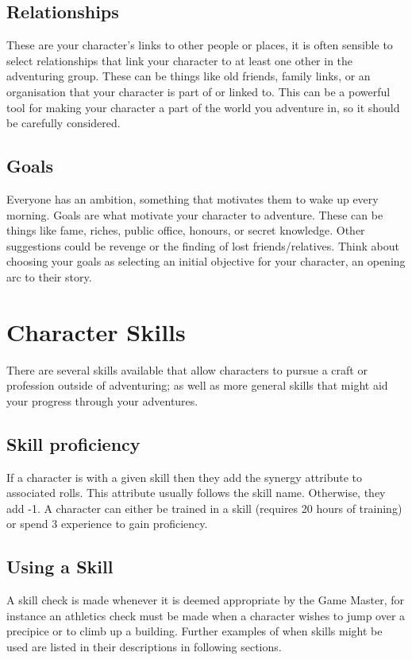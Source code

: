\documentclass[a4paper,10pt,oneside]{book}
\newcommand{\textlf}[1]{\textbf{\titlecap{#1}}}
\begin{document}
\section{Relationships}
\label{sec:relationships}
These are your character's links to other people or places, it is often sensible to select relationships that link your character to at least one other in the adventuring group. These can be things like old friends, family links, or an organisation that your character is part of or linked to. This can be a powerful tool for making your character a part of the world you adventure in, so it should be carefully considered.


\section{Goals}
\label{sec:goals}
Everyone has an ambition, something that motivates them to wake up every morning. Goals are what motivate your character to adventure. These can be things like fame, riches, public office, honours, or secret knowledge. Other suggestions could be revenge or the finding of lost friends/relatives. Think about choosing your goals as selecting an initial objective for your character, an opening arc to their story.




\chapter{Character Skills}
\label{chap:skills}
There are several skills available that allow characters to pursue a craft or profession outside of adventuring; as well as more general skills that might aid your progress through your adventures.

\section{Skill proficiency}
\label{sec:skill-prof}
If a character is \textlf{proficient} with a given skill then they add the synergy attribute to associated rolls. This attribute usually follows the skill name. Otherwise, they add -1. A character can either be trained in a skill (requires 20 hours of training) or spend 3 experience to gain proficiency.


\section{Using a Skill}
\label{sec:use-skill}
A skill check is made whenever it is deemed appropriate by the Game Master, for instance an athletics check must be made when a character wishes to jump over a precipice or to climb up a building. Further examples of when skills might be used are listed in their descriptions in following sections.
\end{document}
